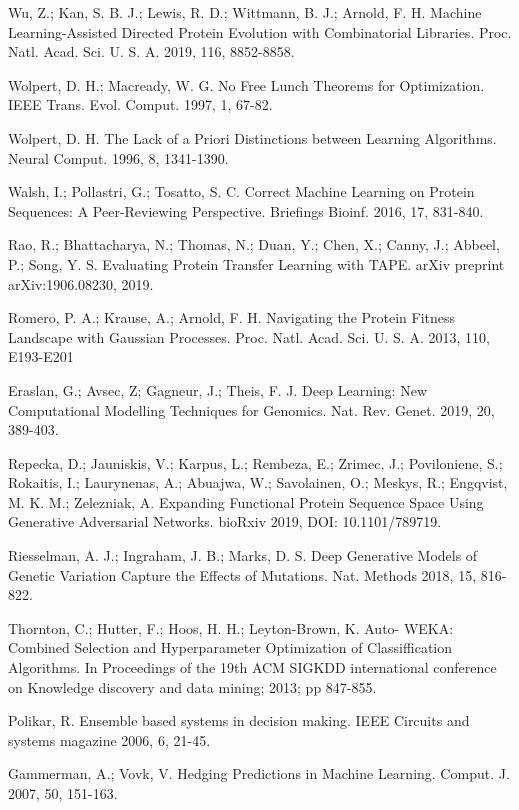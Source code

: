 \documentclass[12pt]{article}
\begin{document}
\begin{thebibliography}{99}
 Wu, Z.; Kan, S. B. J.; Lewis, R. D.; Wittmann, B. J.; Arnold, F. H. Machine Learning-Assisted Directed Protein Evolution with Combinatorial Libraries. Proc. Natl. Acad. Sci. U. S. A. 2019, 116, 8852-8858.

 Wolpert, D. H.; Macready, W. G. No Free Lunch Theorems for Optimization. IEEE Trans. Evol. Comput. 1997, 1, 67-82.

 Wolpert, D. H. The Lack of a Priori Distinctions between Learning Algorithms. Neural Comput. 1996, 8, 1341-1390.

 Walsh, I.; Pollastri, G.; Tosatto, S. C. Correct Machine Learning on Protein Sequences: A Peer-Reviewing Perspective. Briefings Bioinf. 2016, 17, 831-840.

 Rao, R.; Bhattacharya, N.; Thomas, N.; Duan, Y.; Chen, X.; Canny, J.; Abbeel, P.; Song, Y. S. Evaluating Protein Transfer Learning with TAPE. arXiv preprint arXiv:1906.08230, 2019.


 Romero, P. A.; Krause, A.; Arnold, F. H. Navigating the Protein Fitness Landscape with Gaussian Processes. Proc. Natl. Acad. Sci. U. S. A. 2013, 110, E193-E201

 Eraslan, G.; Avsec, Z; Gagneur, J.; Theis, F. J. Deep Learning: New Computational Modelling Techniques for Genomics. Nat. Rev. Genet. 2019, 20, 389-403.

 Repecka, D.; Jauniskis, V.; Karpus, L.; Rembeza, E.; Zrimec, J.; Poviloniene, S.; Rokaitis, I.; Laurynenas, A.; Abuajwa, W.; Savolainen, O.; Meskys, R.; Engqvist, M. K. M.; Zelezniak, A. Expanding Functional Protein Sequence Space Using Generative Adversarial Networks. bioRxiv 2019, DOI: 10.1101/789719.

 Riesselman, A. J.; Ingraham, J. B.; Marks, D. S. Deep Generative Models of Genetic Variation Capture the Effects of Mutations. Nat. Methods 2018, 15, 816-822.

 Thornton, C.; Hutter, F.; Hoos, H. H.; Leyton-Brown, K. Auto- WEKA: Combined Selection and Hyperparameter Optimization of Classiffication Algorithms. In Proceedings of the 19th ACM SIGKDD international conference on Knowledge discovery and data mining; 2013; pp 847-855.

 Polikar, R. Ensemble based systems in decision making. IEEE Circuits and systems magazine 2006, 6, 21-45.

 Gammerman, A.; Vovk, V. Hedging Predictions in Machine Learning. Comput. J. 2007, 50, 151-163.


\end{thebibliography}
\end{document}
